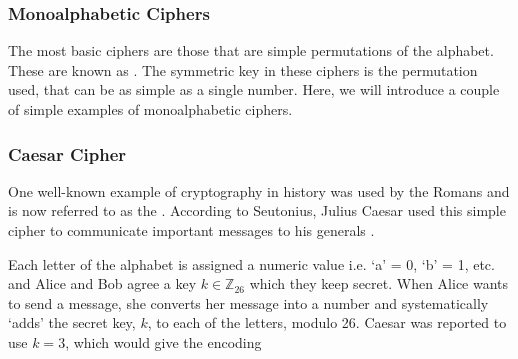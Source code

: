 

\subsubsection{Monoalphabetic Ciphers}

The most basic ciphers are those that are simple permutations of the alphabet. These are known as . The symmetric key in these ciphers is the permutation used, that can be as simple as a single number. Here, we will introduce a couple of simple examples of monoalphabetic ciphers. 

\subsubsection*{Caesar Cipher}

One well-known example of cryptography in history was used by the Romans and is now referred to as the . According to Seutonius, Julius Caesar used this simple cipher to communicate important messages to his generals \cite{Suetonius}. 

Each letter of the alphabet is assigned a numeric value i.e. `a' = 0, `b' = 1, etc. and Alice and Bob agree a key $k\in\mathbb{Z}_{26}$ which they keep secret. When Alice wants to send a message, she converts her message into a number and systematically `adds' the secret key, $k$, to each of the letters, modulo 26. Caesar was reported to use $k=3$, which would give the encoding 




